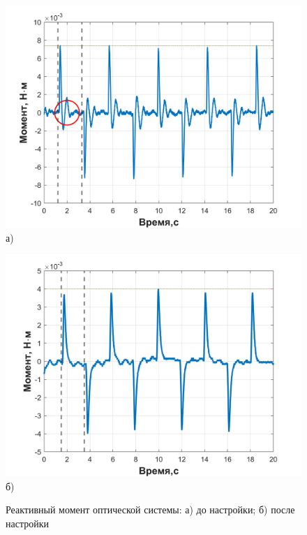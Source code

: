 \begin{figure}[h!]
	\begin{minipage}[b]{0.49\linewidth}\centering
		\includegraphics[width=1\linewidth]{matlab/img/scanner_no_sinchron} \\ а)
	\end{minipage}
	\hfill
	\begin{minipage}[b]{0.49\linewidth}\centering
		\includegraphics[width=1\linewidth]{matlab/img/scanner_correct} \\ б)
	\end{minipage}
	\caption{Реактивный момент оптической системы: а) до настройки; б) после настройки}
	\label{fig:scan-mom}
\end{figure}

